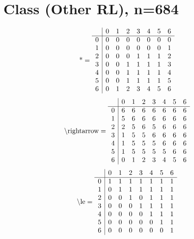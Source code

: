\documentclass[11pt]{article}
\begin{document}
\section{Class (Other RL), n=684}
\[\text{*} = 
\begin{array}{r | r r r r r r r}
 & 0 & 1 & 2 & 3 & 4 & 5 & 6 \\ \hline
0 & 0 & 0 & 0 & 0 & 0 & 0 & 0 \\
1 & 0 & 0 & 0 & 0 & 0 & 0 & 1 \\
2 & 0 & 0 & 0 & 1 & 1 & 1 & 2 \\
3 & 0 & 0 & 1 & 1 & 1 & 1 & 3 \\
4 & 0 & 0 & 1 & 1 & 1 & 1 & 4 \\
5 & 0 & 0 & 1 & 1 & 1 & 1 & 5 \\
6 & 0 & 1 & 2 & 3 & 4 & 5 & 6 \\
\end{array}
\]
\[\text{\textbackslash rightarrow} = 
\begin{array}{r | r r r r r r r}
 & 0 & 1 & 2 & 3 & 4 & 5 & 6 \\ \hline
0 & 6 & 6 & 6 & 6 & 6 & 6 & 6 \\
1 & 5 & 6 & 6 & 6 & 6 & 6 & 6 \\
2 & 2 & 5 & 6 & 5 & 6 & 6 & 6 \\
3 & 1 & 5 & 5 & 6 & 6 & 6 & 6 \\
4 & 1 & 5 & 5 & 5 & 6 & 6 & 6 \\
5 & 1 & 5 & 5 & 5 & 5 & 6 & 6 \\
6 & 0 & 1 & 2 & 3 & 4 & 5 & 6 \\
\end{array}
\]
\[\text{\textbackslash le} = 
\begin{array}{r | r r r r r r r}
 & 0 & 1 & 2 & 3 & 4 & 5 & 6 \\ \hline
0 & 1 & 1 & 1 & 1 & 1 & 1 & 1 \\
1 & 0 & 1 & 1 & 1 & 1 & 1 & 1 \\
2 & 0 & 0 & 1 & 0 & 1 & 1 & 1 \\
3 & 0 & 0 & 0 & 1 & 1 & 1 & 1 \\
4 & 0 & 0 & 0 & 0 & 1 & 1 & 1 \\
5 & 0 & 0 & 0 & 0 & 0 & 1 & 1 \\
6 & 0 & 0 & 0 & 0 & 0 & 0 & 1 \\
\end{array}
\]
\end{document}
